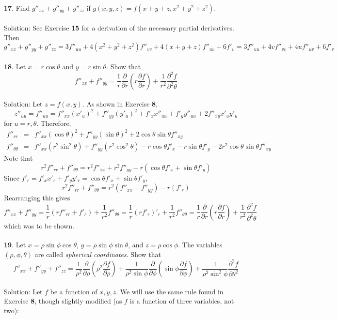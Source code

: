 \documentclass[12pt]{amsbook}
\begin{document}
\noindent
\\
{\small\bf 17}. Find $g''_{xx}+g''_{yy}+g''_{zz}$ if $g(x, y, z) = f(x + y + z, x^2+y^2+z^2)$.
\\
\\
{\sc Solution}: See Exercise {\bf 15} for a derivation of the necessary partial derivatives. Then 
$$g''_{xx}+g''_{yy}+g''_{zz}=3f''_{uu}+4(x^2+y^2+z^2)f''_{vv}+4(x+y+z)f''_{uv}+6f'_v=3f''_{uu}+4vf''_{vv}+4uf''_{uv}+6f'_v$$
\\
{\small\bf 18}. Let $x = r \cos \theta$ and $y = r \sin \theta$. Show that
$$f''_{xx}+f''_{yy}=\frac{1}{r}\frac{\partial}{\partial r}(r\frac{\partial f}{\partial r})+\frac{1}{r^2}\frac{\partial ^2f}{\partial ^2 \theta}$$
\\
{\sc Solution}: Let $z=f(x,y)$. As shown in Exercise {\bf 8}, 
$$z''_{uu}=f''_{uu}=f''_{xx}(x'_u)^2+f''_{yy}(y'_u)^2+f'_xx''_{uu}+f'_yy''_{uu}+2f''_{xy}x'_uy'_u$$
for $u=r, \theta$. Therefore,
\begin{eqnarray*}
f''_{rr}&=&f''_{xx}(\cos \theta)^2+f''_{yy}(\sin \theta)^2+2\cos \theta \sin \theta f''_{xy} \\
f''_{\theta\theta}&=&f''_{xx}(r^2\sin^2\theta)+f''_{yy}(r^2\cos^2\theta)-r\cos\theta f'_x-r\sin\theta f'_y-2r^2\cos\theta\sin \theta f''_{xy}
\end{eqnarray*}
Note that
$$r^2f''_{rr}+f''_{\theta \theta}=r^2f''_{xx}+r^2f''_{yy}-r(\cos \theta f'_x+\sin \theta f'_y)$$
Since $f'_r=f'_xx'_r+f'_yy'_r=\cos \theta f'_x+\sin \theta f'_y$, 
$$r^2f''_{rr}+f''_{\theta \theta}=r^2(f''_{xx}+f''_{yy})-r(f'_r)$$
Rearranging this gives
$$f''_{xx}+f''_{yy}=\frac{1}{r}(rf''_{rr}+f'_r)+\frac{1}{r^2}f''_{\theta \theta}=\frac{1}{r}(rf'_r)'_r+\frac{1}{r^2}f''_{\theta \theta}=\frac{1}{r}\frac{\partial }{\partial r}(r\frac{\partial f}{\partial r})+\frac{1}{r^2}\frac{\partial ^2 f}{\partial ^2 \theta}$$
which was to be shown.
\\
\\
{\small\bf 19}. Let $x = \rho \sin \phi \cos \theta$, $y = \rho \sin \phi \sin \theta$, and $z=\rho \cos \phi$. The variables
$(\rho, \phi, \theta)$ are called {\it spherical coordinates}. Show that
$$f''_{xx}+f''_{yy}+f''_{zz}=\frac{1}{\rho^2}\frac{\partial}{\partial \rho}(\rho ^2\frac{\partial f}{\partial \rho})+\frac{1}{\rho^2\sin \phi}\frac{\partial}{\partial \phi}(\sin \phi \frac{\partial f}{\partial \phi})+\frac{1}{\rho^2\sin^2\phi}\frac{\partial ^2f}{\partial  \theta^2}$$
\\
{\sc Solution}: Let $f$ be a function of $x,y,z$. We will use the same rule found in Exercise {\bf 8}, though slightly modified (as $f$ is a function of three variables, not two):
\end{document}
